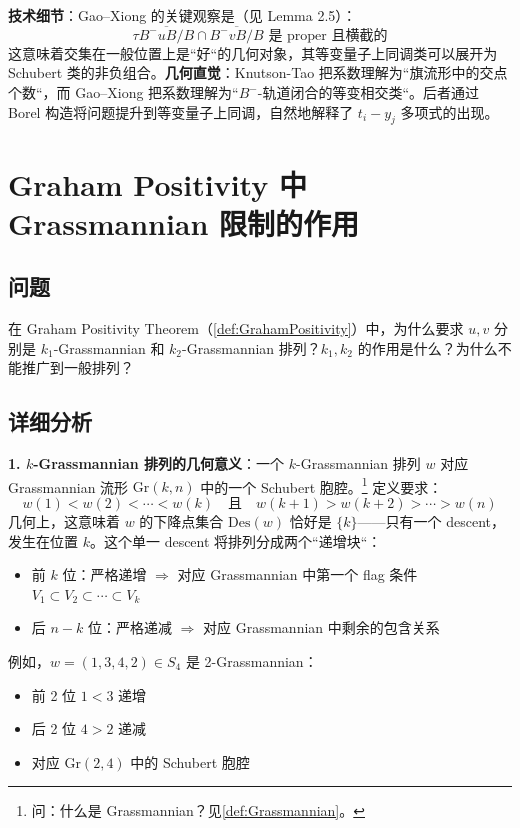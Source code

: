 \textbf{技术细节}：Gao--Xiong \cite{GX2025} 的关键观察是（见 Lemma 2.5）：$$\tau \overline{B^-uB/B} \cap \overline{B^-vB/B} \text{ 是 proper 且横截的}$$这意味着交集在一般位置上是``好``的几何对象，其等变量子上同调类可以展开为 Schubert 类的非负组合。\textbf{几何直觉}：Knutson-Tao 把系数理解为``旗流形中的交点个数``，而 Gao--Xiong \cite{GX2025} 把系数理解为``$B^-$-轨道闭合的等变相交类``。后者通过 Borel 构造将问题提升到等变量子上同调，自然地解释了 $t_i - y_j$ 多项式的出现。
\section{Graham Positivity 中 Grassmannian 限制的作用}\label{sec:GrassmannianRole}
\subsection{问题}
在 Graham Positivity Theorem（\cref{def:GrahamPositivity}）中，为什么要求 $u, v$ 分别是 $k_1$-Grassmannian 和 $k_2$-Grassmannian 排列？$k_1, k_2$ 的作用是什么？为什么不能推广到一般排列？
\subsection{详细分析}\textbf{1. $k$-Grassmannian 排列的几何意义}：一个 $k$-Grassmannian 排列 $w$ 对应 Grassmannian 流形 $\mathrm{Gr}(k, n)$ 中的一个 Schubert 胞腔。\footnote{问：什么是 Grassmannian？见\cref{def:Grassmannian}。} 定义要求：$$w(1) < w(2) < \cdots < w(k) \quad \text{且} \quad w(k+1) > w(k+2) > \cdots > w(n)$$几何上，这意味着 $w$ 的下降点集合 $\mathrm{Des}(w)$ 恰好是 $\{k\}$——只有一个 descent，发生在位置 $k$。这个单一 descent 将排列分成两个``递增块``：
\begin{itemize}
\item 前 $k$ 位：严格递增 $\Rightarrow$ 对应 Grassmannian 中第一个 flag 条件 $V_1 \subset V_2 \subset \cdots \subset V_k$
\item 后 $n-k$ 位：严格递减 $\Rightarrow$ 对应 Grassmannian 中剩余的包含关系
\end{itemize}
例如，$w = (1, 3, 4, 2) \in S_4$ 是 2-Grassmannian：
\begin{itemize}
\item 前 2 位 $1 < 3$ 递增
\item 后 2 位 $4 > 2$ 递减
\item 对应 $\mathrm{Gr}(2, 4)$ 中的 Schubert 胞腔
\end{itemize}

